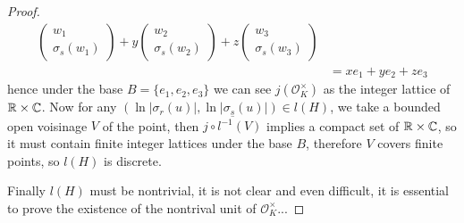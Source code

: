 \begin{theorem}
\begin{proof}
\begin{align*}
\begin{pmatrix}
                w_1 \\
                \sigma_s(w_1)
             \end{pmatrix}+y\begin{pmatrix}
                w_2 \\
                \sigma_s(w_2)
             \end{pmatrix}+z\begin{pmatrix}
                w_3 \\
                \sigma_s(w_3)
             \end{pmatrix} \\
             &= xe_1+ye_2+ze_3
         \end{align*}
        hence under the base \(B=\{e_1,e_2,e_3\}\) we can see \(j({\mathcal{O}_K^\times})\) as the integer lattice of \(\mathbb{R} \times \mathbb{C}\). Now for any \((\ln|\sigma_r(u)|,\ln|\sigma_s(u)|) \in l(H)\), we take a bounded open voisinage \(V\) of the point, then \(\overline{j\circ l^{-1}(V)}\) implies a compact set of \(\mathbb{R} \times \mathbb{C}\), so it must contain finite integer lattices under the base \(B\), therefore \(V\) covers finite points, so \(l(H)\) is discrete.

        Finally \(l(H)\) must be nontrivial, it is not clear and even difficult, it is essential to prove the existence of the nontrival unit of \(\mathcal{O}_K^{\times}\)...
    \end{proof}
\end{theorem}

